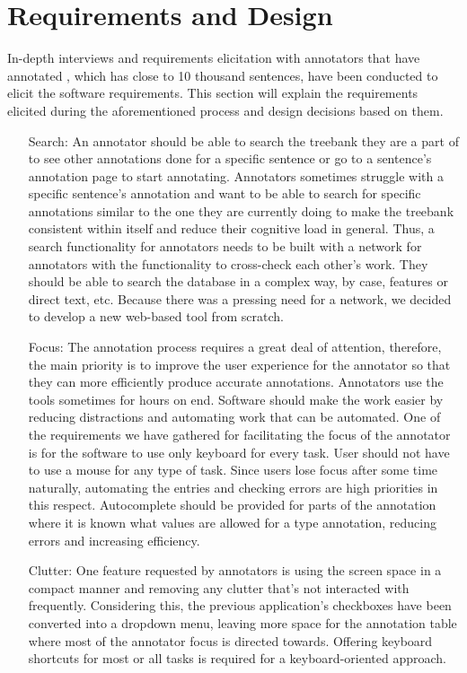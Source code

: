 \section{Requirements and Design}
\label{sec:requirements}

In-depth interviews and requirements elicitation with annotators that have annotated \bountreebank{}, which has close to 10 thousand sentences, have been conducted to elicit the software requirements.
This section will explain the requirements elicited during the aforementioned process and design decisions based on them.

\begin{itemize}[before=\normalfont, font=\itshape, align=left]
\item[Search:]
An annotator should be able to search the treebank they are a part of to see other annotations done for a specific sentence or go to a sentence's annotation page to start annotating.
Annotators sometimes struggle with a specific sentence's annotation and want to be able to search for specific annotations similar to the one they are currently doing to make the treebank consistent within itself and reduce their cognitive load in general.
Thus, a search functionality for annotators needs to be built with a network for annotators with the functionality to cross-check each other's work.
They should be able to search the database in a complex way, by case, features or direct text, etc.
Because there was a pressing need for a network, we decided to develop a new web-based tool from scratch.

\item[Focus:]
The annotation process requires a great deal of attention, therefore, the main priority is to improve the user experience for the annotator so that they can more efficiently produce accurate annotations.
Annotators use the tools sometimes for hours on end.
Software should make the work easier by reducing distractions and automating work that can be automated.
One of the requirements we have gathered for facilitating the focus of the annotator is for the software to use only keyboard for every task.
User should not have to use a mouse for any type of task.
Since users lose focus after some time naturally, automating the entries and checking errors are high priorities in this respect.
Autocomplete should be provided for parts of the annotation where it is known what values are allowed for a \conllu{} type annotation, reducing errors and increasing efficiency.

\item[Clutter:]
One feature requested by annotators is using the screen space in a compact manner and removing any clutter that's not interacted with frequently.
Considering this, the previous application's checkboxes have been converted into a dropdown menu, leaving more space for the annotation table where most of the annotator focus is directed towards.
Offering keyboard shortcuts for most or all tasks is required for a keyboard-oriented approach.


\end{itemize}

